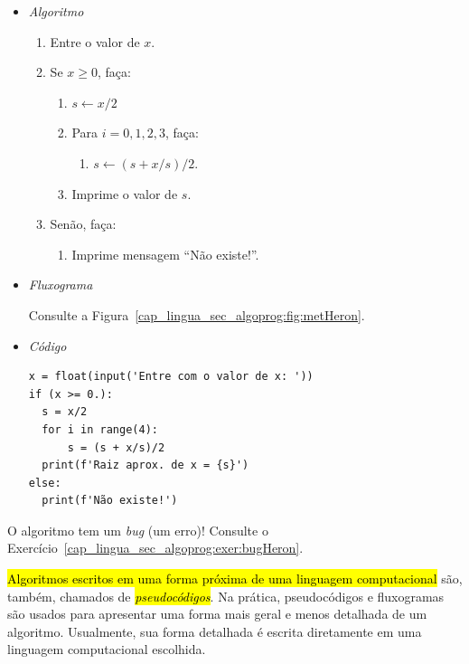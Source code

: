 \begin{ex}
  \begin{itemize}
  \item \emph{Algoritmo}
    \begin{enumerate}
    \item Entre o valor de $x$.
    \item Se $x\geq 0$, faça:
      \begin{enumerate}
      \item $s \leftarrow x/2$
      \item Para $i = 0,1,2,3$, faça:
        \begin{enumerate}
        \item $s \leftarrow (s + x/s)/2$.
        \end{enumerate}
      \item Imprime o valor de $s$.
      \end{enumerate}
    \item Senão, faça:
      \begin{enumerate}
      \item Imprime mensagem ``Não existe!''.
      \end{enumerate}
    \end{enumerate}

  \item \emph{Fluxograma}
  
    Consulte a Figura~\ref{cap_lingua_sec_algoprog:fig:metHeron}.
    
  \item \emph{Código {\python}}

\begin{lstlisting}[caption=metHeron.py,label=cap_lingua_sec_algoprog:cod:metHeron, xrightmargin=2.5em]
x = float(input('Entre com o valor de x: '))
if (x >= 0.):
  s = x/2
  for i in range(4):
      s = (s + x/s)/2
  print(f'Raiz aprox. de x = {s}')
else:
  print(f'Não existe!')
\end{lstlisting}

  \end{itemize}

  O algoritmo tem um \textit{bug} (um erro)! Consulte o Exercício~\ref{cap_lingua_sec_algoprog:exer:bugHeron}.
\end{ex}

\hl{Algoritmos escritos em uma forma próxima de uma linguagem computacional} são, também, chamados de \hl{\emph{pseudocódigos}}. Na prática, pseudocódigos e fluxogramas são usados para apresentar uma forma mais geral e menos detalhada de um algoritmo. Usualmente, sua forma detalhada é escrita diretamente em uma linguagem computacional escolhida.

